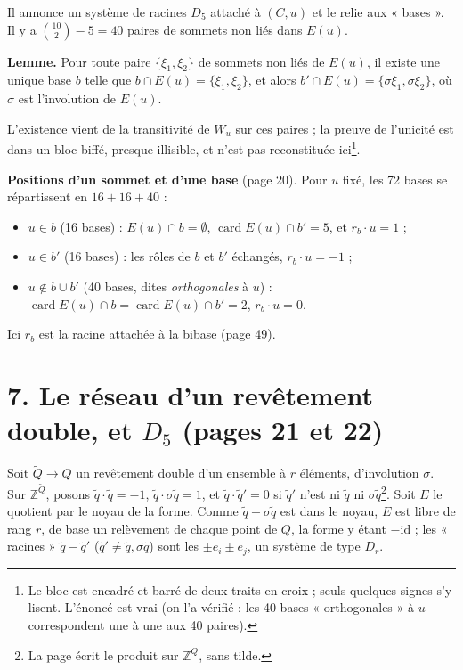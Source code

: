 \documentclass[11pt,a4paper]{article}
\begin{document}
Il annonce un système de racines $D_5$ attaché à $(C, u)$ et le relie aux
« bases ». Il y a $\binom{10}{2} - 5 = 40$ paires de sommets non liés dans
$E(u)$.

\textbf{Lemme.} Pour toute paire $\lbrace \xi_1, \xi_2\rbrace$ de sommets non
liés de $E(u)$, il existe une unique base $b$ telle que $b \cap E(u) =
\lbrace\xi_1, \xi_2\rbrace$, et alors $b' \cap E(u) = \lbrace \sigma\xi_1,
\sigma\xi_2\rbrace$, où $\sigma$ est l'involution de $E(u)$.

L'existence vient de la transitivité de $W_u$ sur ces paires ; la preuve de
l'unicité est dans un bloc biffé, presque illisible, et n'est pas
reconstituée ici\footnote{Le bloc est encadré et barré de deux traits en
croix ; seuls quelques signes s'y lisent. L'énoncé est vrai (on l'a vérifié :
les 40 bases « orthogonales » à $u$ correspondent une à une aux 40 paires).}.

\textbf{Positions d'un sommet et d'une base} (page 20). Pour $u$ fixé, les 72
bases se répartissent en $16 + 16 + 40$ :
\begin{itemize}
\item[(i)] $u \in b$ (16 bases) : $E(u) \cap b = \emptyset$, $\operatorname{card}
  E(u) \cap b' = 5$, et $r_b \cdot u = 1$ ;
\item[(ii)] $u \in b'$ (16 bases) : les rôles de $b$ et $b'$ échangés, $r_b
  \cdot u = -1$ ;
\item[(iii)] $u \notin b \cup b'$ (40 bases, dites \emph{orthogonales} à $u$)
  : $\operatorname{card} E(u) \cap b = \operatorname{card} E(u) \cap b' = 2$,
  $r_b \cdot u = 0$.
\end{itemize}
Ici $r_b$ est la racine attachée à la bibase (page 49).

\section*{7. Le réseau d'un revêtement double, et $D_5$ (pages 21 et 22)}

Soit $\widetilde Q \to Q$ un revêtement double d'un ensemble à $r$ éléments,
d'involution $\sigma$. Sur $\mathbb{Z}^{\widetilde Q}$, posons $\tilde q \cdot
\tilde q = -1$, $\tilde q \cdot \sigma\tilde q = 1$, et $\tilde q \cdot \tilde
q' = 0$ si $\tilde q'$ n'est ni $\tilde q$ ni $\sigma \tilde q$\footnote{La page
écrit le produit sur $\mathbb{Z}^Q$, sans tilde.}. Soit $E$ le quotient par le
noyau de la forme. Comme $\tilde q + \sigma \tilde q$ est dans le noyau, $E$
est libre de rang $r$, de base un relèvement de chaque point de $Q$, la forme y
étant $-\mathrm{id}$ ; les « racines » $\tilde q - \tilde q'$ ($\tilde q' \neq
\tilde q, \sigma \tilde q$) sont les $\pm e_i \pm e_j$, un système de type
$D_r$.
\end{document}
